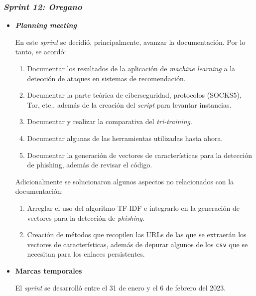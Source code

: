 \subsubsection{\textit{Sprint 12: Oregano}}
\begin{itemize}
	
	\item \textbf{\textit{Planning meeting}}
	
	En este \textit{sprint} se decidió, principalmente, avanzar la documentación. Por lo tanto, se acordó:
	\begin{enumerate}
		\item Documentar los resultados de la aplicación de \textit{machine learning} a la detección de ataques en sistemas de recomendación.
		\item Documentar la parte teórica de ciberseguridad, protocolos (SOCKS5), Tor, etc., además de la creación del \textit{script} para levantar instancias.
		\item Documentar y realizar la comparativa del \textit{tri-training}.
		\item Documentar algunas de las herramientas utilizadas hasta ahora.
		\item Documentar la generación de vectores de características para la detección de phishing, además de revisar el código.
	\end{enumerate}
	
	Adicionalmente se solucionaron algunos aspectos no relacionados con la documentación:
	
	\begin{enumerate}
		\item Arreglar el uso del algoritmo TF-IDF e integrarlo en la generación de vectores para la detección de \textit{phishing}.
		\item Creación de métodos que recopilen las URLs de las que se extraerán los vectores de características, además de depurar algunos de los \texttt{csv} que se necesitan para los enlaces persistentes.
	\end{enumerate}
	
	\item \textbf{Marcas temporales}		
	
	El \textit{sprint} se desarrolló entre el 31 de enero y el 6 de febrero del 2023.
	

\end{itemize}
